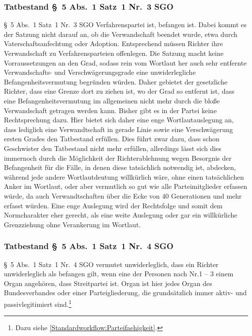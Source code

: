 \subsubsection{Tatbestand \S~5 Abs.~1 Satz~1 Nr.~3 SGO}
\label{Zusammensetzung:Spruchkoerper:Befangenheitsvermutung:Nr3}
\S~5 Abs.~1 Satz~1 Nr.~3 SGO Verfahrenspartei ist, befangen ist.
Dabei kommt es der Satzung nicht darauf an, ob die Verwandschaft beendet wurde, etwa durch Vaterschaftsanfechtung oder Adoption.
Entsprechend müssen Richter ihre Verwandschaft zu Verfahrensparteien offenlegen.
Die Satzung macht keine Vorraussetzungen an den Grad, sodass rein vom Wortlaut her auch sehr entfernte Verwandschafts- und Verschwägerungsgrade eine unwiderlegliche Befangenheitsvermutung begründen würden.
Daher gebietet der gesetzliche Richter, dass eine Grenze dort zu ziehen ist, wo der Grad so entfernt ist, dass eine Befangenheitsvermutung im allgemeinen nicht mehr durch die bloße Verwandschaft getragen werden kann.
Bisher gibt es in der Partei keine Rechtsprechung dazu.
Hier bietet sich daher eine enge Wortlautauslegung an, dass lediglich eine Verwandtschaft in gerade Linie sowie eine Verschwägerung ersten Grades den Tatbestand erfüllen.
Dies führt zwar dazu, dass schon Geschwister den Tatbestand nicht mehr erfüllen, allerdings lässt sich dies immernoch durch die Möglichkeit der Richterablehnung wegen Besorgnis der Befangenheit für die Fälle, in denen diese tatsächlich notwendig ist, abdecken, während jede andere Wortlautdeutung willkürlich wäre, ohne einen tatsächlichen Anker im Wortlaut, oder aber vermutlich so gut wie alle Parteimitglieder erfassen würde, da auch Verwandtschaften über die Ecke von 40 Generationen und mehr erfasst würden.
Eine enge Auslegung wird der Rechtsfolge und somit dem Normcharakter eher gerecht, als eine weite Auslegung oder gar ein willkürliche Grenzziehung ohne Verankerung im Wortlaut.

\subsubsection{Tatbestand \S~5 Abs.~1 Satz~1 Nr.~4 SGO}
\label{Zusammensetzung:Spruchkoerper:Befangenheitsvermutung:Nr4}
\S~5 Abs.~1 Satz~1 Nr.~4 SGO vermutet unwiderleglich, dass ein Richter unwiderleglich als befangen gilt, wenn eine der Personen nach Nr.1 -- 3 einem Organ angehören, dass Streitpartei ist.
Organ ist hier jedes Organ des Bundesverbandes oder einer Parteigliederung, die grundsätzlich immer aktiv- und passivlegitimiert sind.\footnote{Dazu siehe \ref{Standardworkflow:Parteifaehigkeit}.}

